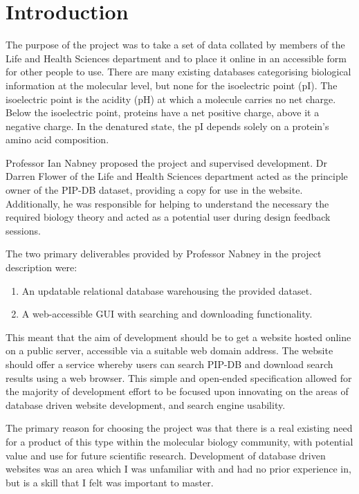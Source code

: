 \chapter{Introduction}\label{chap:introduction}

The purpose of the project was to take a set of data collated by
members of the Life and Health Sciences department and to place it
online in an accessible form for other people to use. There are many
existing databases categorising biological information at the
molecular level, but none for the isoelectric point (pI). The
isoelectric point is the acidity (pH) at which a molecule carries no
net charge. Below the isoelectric point, proteins have a net positive
charge, above it a negative charge. In the denatured state, the pI
depends solely on a protein’s amino acid composition.

Professor Ian Nabney proposed the project and supervised
development. Dr Darren Flower of the Life and Health Sciences
department acted as the principle owner of the PIP-DB dataset,
providing a copy for use in the website. Additionally, he was
responsible for helping to understand the necessary the required
biology theory and acted as a potential user during design feedback
sessions.

The two primary deliverables provided by Professor Nabney in the
project description were:

\begin{enumerate}
\item An updatable relational database warehousing the provided dataset.
\item A web-accessible GUI with searching and downloading functionality.
\end{enumerate}

This meant that the aim of development should be to get a website
hosted online on a public server, accessible via a suitable web domain
address. The website should offer a service whereby users can search
PIP-DB and download search results using a web browser. This simple
and open-ended specification allowed for the majority of development
effort to be focused upon innovating on the areas of database driven
website development, and search engine usability.

The primary reason for choosing the project was that there is a real
existing need for a product of this type within the molecular biology
community, with potential value and use for future scientific
research. Development of database driven websites was an area which I
was unfamiliar with and had no prior experience in, but is a skill
that I felt was important to master.

